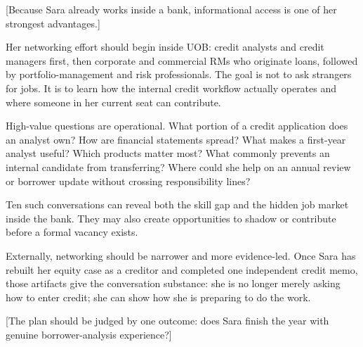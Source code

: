 \documentclass[theme=editorial,publication-type=feature-article]{reportkit}
\begin{document}
[Because Sara already works inside a bank, informational access is one of her strongest advantages.]

\begin{featurecolumns}
Her networking effort should begin inside UOB: credit analysts and credit managers first, then corporate and commercial RMs who originate loans, followed by portfolio-management and risk professionals. The goal is not to ask strangers for jobs. It is to learn how the internal credit workflow actually operates and where someone in her current seat can contribute.

High-value questions are operational. What portion of a credit application does an analyst own? How are financial statements spread? What makes a first-year analyst useful? Which products matter most? What commonly prevents an internal candidate from transferring? Where could she help on an annual review or borrower update without crossing responsibility lines?

Ten such conversations can reveal both the skill gap and the hidden job market inside the bank. They may also create opportunities to shadow or contribute before a formal vacancy exists.

Externally, networking should be narrower and more evidence-led. Once Sara has rebuilt her equity case as a creditor and completed one independent credit memo, those artifacts give the conversation substance: she is no longer merely asking how to enter credit; she can show how she is preparing to do the work.
\end{featurecolumns}

[The plan should be judged by one outcome: does Sara finish the year with genuine borrower-analysis experience?]
\end{document}
